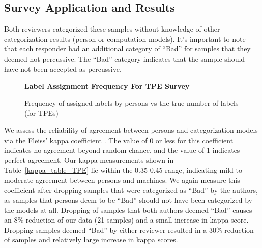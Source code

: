 \documentclass[\main/thesis.tex]{subfiles}
\begin{document}
 \subsection{Survey Application and Results}
Both reviewers categorized these samples without knowledge of other categorization results (person or computation models). It's important to note that each responder had an additional category of \enquote{Bad} for samples that they deemed not percussive. The \enquote{Bad} category indicates that the sample should have not been accepted as percussive.

\begin{figure}[h!]
    \begin{center}
    \textbf{Label Assignment Frequency For TPE Survey}
    \end{center}
    \caption{Frequency of assigned labels by persons vs the true number of labels (for TPEs)}
\label{fig:freq-survey-2p}
\end{figure}
We assess the reliability of agreement between persons and categorization models via the Fleiss' kappa coefficient \cite{fleiss1971measuring}. The value of 0 or less for this coefficient indicates no agreement beyond random chance, and the value of 1 indicates perfect agreement. Our kappa measurements shown in Table~\ref{kappa_table_TPE} lie within the 0.35-0.45 range, indicating mild to moderate agreement between persons and machines. We again measure this coefficient after dropping samples that were categorized as \enquote{Bad} by the authors, as samples that persons deem to be \enquote{Bad} should not have been categorized by the models at all. Dropping of samples that both authors deemed \enquote{Bad} causes an 8\% reduction of our data (21 samples) and a small increase in kappa score. Dropping samples deemed \enquote{Bad} by either reviewer resulted in a 30\% reduction of samples and relatively large increase in kappa scores. 
\end{document}
